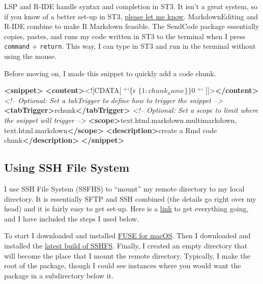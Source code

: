 \documentclass[]{book}
\newenvironment{Shaded}{\begin{snugshade}}{\end{snugshade}}
\newcommand{\BaseNTok}[1]{\textcolor[rgb]{0.00,0.00,0.81}{#1}}
\newcommand{\CommentTok}[1]{\textcolor[rgb]{0.56,0.35,0.01}{\textit{#1}}}
\newcommand{\KeywordTok}[1]{\textcolor[rgb]{0.13,0.29,0.53}{\textbf{#1}}}
\newcommand{\NormalTok}[1]{#1}
\begin{document}
LSP and R-IDE handle syntax and completion in ST3. It isn't a great system, so if you know of a better set-up in ST3, \href{https://github.com/jhrcook/package-as-analysis/issues}{please let me know}. MarkdownEditing and R-IDE combine to make R Markdown feasible. The SendCode package essentially copies, pastes, and runs my code written in ST3 to the terminal when I press \texttt{command} + \texttt{return}. This way, I can type in ST3 and run in the terminal without using the mouse.

Before moving on, I made this snippet to quickly add a code chunk.

\begin{Shaded}
\begin{Highlighting}[]
\KeywordTok{<snippet>}
        \KeywordTok{<content>}\BaseNTok{<![CDATA[}
\NormalTok{```\{r $\{1:chunk_name\}\}}
\NormalTok{$0}
\NormalTok{```}
\BaseNTok{]]>}\KeywordTok{</content>}
        \CommentTok{<!-- Optional: Set a tabTrigger to define how to trigger the snippet -->}
        \KeywordTok{<tabTrigger>}\NormalTok{rchunk}\KeywordTok{</tabTrigger>}
        \CommentTok{<!-- Optional: Set a scope to limit where the snippet will trigger -->}
        \KeywordTok{<scope>}\NormalTok{text.html.markdown.multimarkdown, text.html.markdown}\KeywordTok{</scope>}
        \KeywordTok{<description>}\NormalTok{create a Rmd code chunk}\KeywordTok{</description>}
\KeywordTok{</snippet>}
\end{Highlighting}
\end{Shaded}

\hypertarget{using-ssh-file-system}{%
\subsection{Using SSH File System}\label{using-ssh-file-system}}

I use SSH File System (SSFHS) to ``mount'' my remote directory to my local directory. It is essentially SFTP and SSH combined (the details go right over my head) and it is fairly easy to get set-up. Here is a \href{https://github.com/osxfuse/osxfuse/wiki/SSHFS}{link} to get everything going, and I have included the steps I used below.

To start I downloaded and installed \href{https://osxfuse.github.io}{FUSE for macOS}. Then I downloaded and installed the \href{https://github.com/osxfuse/sshfs/releases}{latest build of SSHFS}. Finally, I created an empty directory that will become the place that I mount the remote directory. Typically, I make the root of the package, though I could see instances where you would want the package in a subdirectory below it.
\end{document}
